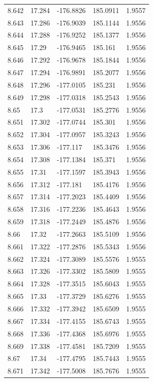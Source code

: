 \begin{tabular}{lllll}
8.642 & 17.284 & -176.8826 & 185.0911 & 1.9557 \\
8.643 & 17.286 & -176.9039 & 185.1144 & 1.9556 \\
8.644 & 17.288 & -176.9252 & 185.1377 & 1.9556 \\
8.645 & 17.29 & -176.9465 & 185.161 & 1.9556 \\
8.646 & 17.292 & -176.9678 & 185.1844 & 1.9556 \\
8.647 & 17.294 & -176.9891 & 185.2077 & 1.9556 \\
8.648 & 17.296 & -177.0105 & 185.231 & 1.9556 \\
8.649 & 17.298 & -177.0318 & 185.2543 & 1.9556 \\
8.65 & 17.3 & -177.0531 & 185.2776 & 1.9556 \\
8.651 & 17.302 & -177.0744 & 185.301 & 1.9556 \\
8.652 & 17.304 & -177.0957 & 185.3243 & 1.9556 \\
8.653 & 17.306 & -177.117 & 185.3476 & 1.9556 \\
8.654 & 17.308 & -177.1384 & 185.371 & 1.9556 \\
8.655 & 17.31 & -177.1597 & 185.3943 & 1.9556 \\
8.656 & 17.312 & -177.181 & 185.4176 & 1.9556 \\
8.657 & 17.314 & -177.2023 & 185.4409 & 1.9556 \\
8.658 & 17.316 & -177.2236 & 185.4643 & 1.9556 \\
8.659 & 17.318 & -177.2449 & 185.4876 & 1.9556 \\
8.66 & 17.32 & -177.2663 & 185.5109 & 1.9556 \\
8.661 & 17.322 & -177.2876 & 185.5343 & 1.9556 \\
8.662 & 17.324 & -177.3089 & 185.5576 & 1.9555 \\
8.663 & 17.326 & -177.3302 & 185.5809 & 1.9555 \\
8.664 & 17.328 & -177.3515 & 185.6043 & 1.9555 \\
8.665 & 17.33 & -177.3729 & 185.6276 & 1.9555 \\
8.666 & 17.332 & -177.3942 & 185.6509 & 1.9555 \\
8.667 & 17.334 & -177.4155 & 185.6743 & 1.9555 \\
8.668 & 17.336 & -177.4368 & 185.6976 & 1.9555 \\
8.669 & 17.338 & -177.4581 & 185.7209 & 1.9555 \\
8.67 & 17.34 & -177.4795 & 185.7443 & 1.9555 \\
8.671 & 17.342 & -177.5008 & 185.7676 & 1.9555 \\

\end{tabular}
